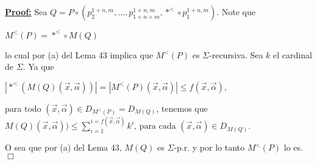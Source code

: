 \textbf{\underline{Proof:}} Sea \(Q=P\circ \left( p_{2}^{1+n,m},...,p_{1+n+m}^{1+n,m},\ast ^{< }\circ p_{1}^{1+n,m}\right) \). Note que

\(\displaystyle M^{< }(P)=\ast ^{< }\circ M(Q) \)

lo cual por (a) del Lema 43 implica que \(M^{< }(P)\) es \( \Sigma \)-recursiva.
Sea \(k\) el cardinal de \(\Sigma \). Ya que

\(\displaystyle \left\vert \ast ^{< }(M(Q)(\vec{x},\vec{\alpha}))\right\vert =\left\vert M^{< }(P)(\vec{x},\vec{\alpha})\right\vert \leq f(\vec{x},\vec{\alpha})\text{, } \)

para todo \((\vec{x},\vec{\alpha})\in D_{M^{< }(P)}=D_{M(Q)}\), tenemos que
\(\displaystyle M(Q)(\vec{x},\vec{\alpha}))\leq \sum_{\iota =1}^{i=f(\vec{x},\vec{\alpha} )}k^{i}\text{, para cada }(\vec{x},\vec{\alpha})\in D_{M(Q)}\text{.} \)

O sea que por (a) del Lema 43, \(M(Q)\) es \(\Sigma \)-p.r. y por lo tanto \(M^{< }(P)\) lo es. \(\Box\)
